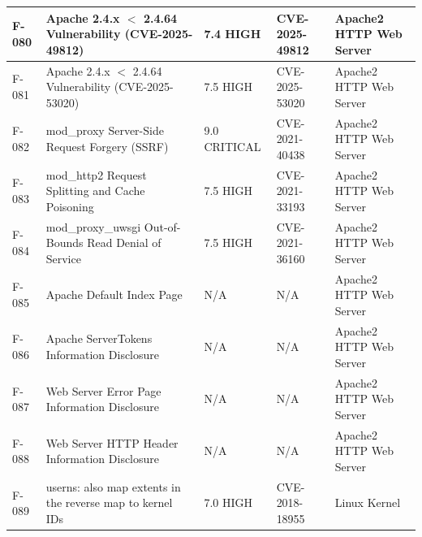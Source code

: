 \begin{longtable}{|l|p{5cm}|l|l|p{3cm}|}
F-080 & Apache 2.4.x $<$ 2.4.64 Vulnerability (CVE-2025-49812) & 7.4 HIGH & CVE-2025-49812 & Apache2 HTTP Web Server\\ \hline
F-081 & Apache 2.4.x $<$ 2.4.64 Vulnerability (CVE-2025-53020) & 7.5 HIGH & CVE-2025-53020 & Apache2 HTTP Web Server\\ \hline
F-082 & mod\_proxy Server-Side Request Forgery (SSRF) & 9.0 CRITICAL & CVE-2021-40438 & Apache2 HTTP Web Server\\ \hline
F-083 & mod\_http2 Request Splitting and Cache Poisoning & 7.5 HIGH & CVE-2021-33193 & Apache2 HTTP Web Server\\ \hline
F-084 & mod\_proxy\_uwsgi Out-of-Bounds Read Denial of Service & 7.5 HIGH & CVE-2021-36160 & Apache2 HTTP Web Server\\ \hline
F-085 & Apache Default Index Page & N/A & N/A & Apache2 HTTP Web Server \\ \hline
F-086 & Apache ServerTokens Information Disclosure & N/A & N/A & Apache2 HTTP Web Server \\ \hline
F-087 & Web Server Error Page Information Disclosure & N/A & N/A & Apache2 HTTP Web Server \\ \hline
F-088 & Web Server HTTP Header Information Disclosure & N/A & N/A & Apache2 HTTP Web Server \\ \hline
F-089 & userns: also map extents in the reverse map to kernel IDs & 7.0 HIGH & CVE-2018-18955 & Linux Kernel \\ \hline
\end{longtable}